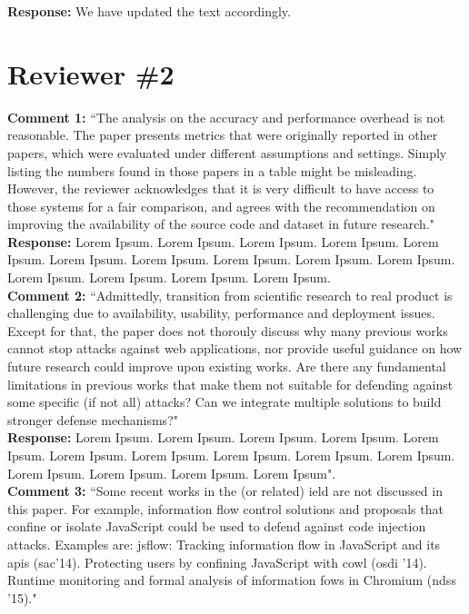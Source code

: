 \documentclass[10pt,journal,compsoc]{IEEEtran}
\begin{document}
\noindent
{\bf Response:}
We have updated the text accordingly.\\

\section{Reviewer \#2}
\label{sec:r2}

{\bf Comment 1:} ``The analysis on the accuracy
and performance overhead is not reasonable.
The paper presents metrics that were originally
reported in other papers,
which were evaluated under different
assumptions and settings.
Simply listing the numbers found in those papers
in a table might be misleading.
However,
the reviewer acknowledges that it is very
difficult to have access to those systems for a fair comparison,
and agrees with the recommendation on improving
the availability of the source code and dataset
in future research."\\

\noindent
{\bf Response:}
Lorem Ipsum. Lorem Ipsum. Lorem Ipsum. Lorem Ipsum.
Lorem Ipsum. Lorem Ipsum. Lorem Ipsum. Lorem Ipsum.
Lorem Ipsum. Lorem Ipsum. Lorem Ipsum. Lorem Ipsum.
Lorem Ipsum. Lorem Ipsum.\\

\noindent
{\bf Comment 2:} ``Admittedly, transition
from scientific research to real product
is challenging due to availability, usability,
performance and deployment issues.
Except for that, the paper does not thorouly
discuss why many previous works
cannot stop attacks against web applications,
nor provide useful guidance on
how future research could improve upon existing works.
Are there any fundamental
limitations in previous works that make
them not suitable for defending against
some specific (if not all) attacks?
Can we integrate multiple solutions to build
stronger defense mechanisms?"\\

\noindent
{\bf Response:}
Lorem Ipsum. Lorem Ipsum. Lorem Ipsum. Lorem Ipsum.
Lorem Ipsum. Lorem Ipsum. Lorem Ipsum. Lorem Ipsum.
Lorem Ipsum. Lorem Ipsum. Lorem Ipsum. Lorem Ipsum.
Lorem Ipsum. Lorem Ipsum".\\

\noindent
{\bf Comment 3:} ``Some recent works in the (or related) 
ield are not discussed in this paper.
For example, information flow control solutions and
proposals that confine or isolate JavaScript could
be used to defend against code injection attacks.
Examples are: {\sc jsf}low: Tracking information
flow in JavaScript and its {\sc api}s ({\sc sac}'14).
Protecting users by confining JavaScript with {\sc cowl} ({\sc osdi} '14).
Runtime monitoring and formal analysis of information
fows in Chromium ({\sc ndss} '15)."\\
\end{document}
